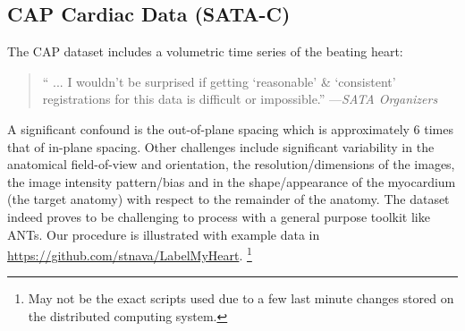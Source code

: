 \documentclass{llncs}
\begin{document}
\subsection{CAP Cardiac Data (SATA-C)}
The CAP dataset includes a volumetric time series of the beating heart:
 \begin{quote}
  `` ... I wouldn't be surprised if getting `reasonable' \& `consistent' registrations for this data is difficult or impossible.'' ---{\em SATA Organizers}
\end{quote}
\noindent A significant confound is the out-of-plane spacing which is
approximately 6 times that of in-plane spacing.  Other challenges
include significant variability in the anatomical field-of-view and
orientation, the resolution/dimensions of the images, the image
intensity pattern/bias and in the shape/appearance of the myocardium
(the target anatomy) with respect to the remainder of the anatomy.
The dataset indeed proves to be challenging to process with a general
purpose toolkit like ANTs.  Our procedure is illustrated with example
data in \url{https://github.com/stnava/LabelMyHeart}. \footnote{May
not be the exact scripts used due to a few last minute changes stored
on the distributed computing system.}
\end{document}
